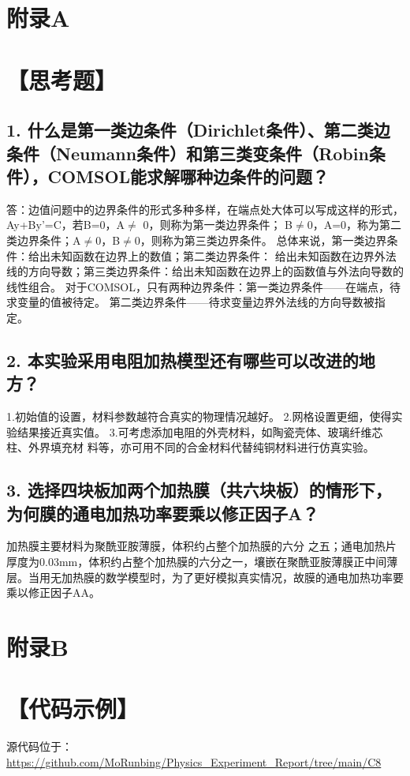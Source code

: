 \documentclass[10pt,a4paper,twoside,UTF8]{ctexart}
\begin{document}
\newpage
\printbibliography[title=参考文献] 
\clearpage

	 
\section*{\LARGE 附录A}
\section*{【思考题】}
\subsection*{1. 什么是第一类边条件（Dirichlet条件）、第二类边条件（Neumann条件）和第三类变条件（Robin条件），COMSOL能求解哪种边条件的问题？}
答：边值问题中的边界条件的形式多种多样，在端点处大体可以写成这样的形式，Ay+By’=C，若B=0，A$\neq$ 0，则称为第一类边界条件；
B$\neq$0，A=0，称为第二类边界条件；A$\neq$0，B$\neq$0，则称为第三类边界条件。
总体来说，第一类边界条件：给出未知函数在边界上的数值；第二类边界条件：
给出未知函数在边界外法线的方向导数；第三类边界条件：给出未知函数在边界上的函数值与外法向导数的线性组合。
对于COMSOL，只有两种边界条件：第一类边界条件——在端点，待求变量的值被待定。
第二类边界条件——待求变量边界外法线的方向导数被指定。
\subsection*{2. 本实验采用电阻加热模型还有哪些可以改进的地方？}
1.初始值的设置，材料参数越符合真实的物理情况越好。
2.网格设置更细，使得实验结果接近真实值。
3.可考虑添加电阻的外壳材料，如陶瓷壳体、玻璃纤维芯柱、外界填充材
料等，亦可用不同的合金材料代替纯铜材料进行仿真实验。
\subsection*{3. 选择四块板加两个加热膜（共六块板）的情形下，为何膜的通电加热功率要乘以修正因子A？}
加热膜主要材料为聚酰亚胺薄膜，体积约占整个加热膜的六分
之五；通电加热片厚度为0.03mm，体积约占整个加热膜的六分之一，壤嵌在聚酰亚胺薄膜正中间薄
层。当用无加热膜的数学模型时，为了更好模拟真实情况，故膜的通电加热功率要乘以修正因子AA。

\newpage
\section*{\LARGE 附录B}
\section*{【代码示例】}
源代码位于：\url{https://github.com/MoRunbing/Physics_Experiment_Report/tree/main/C8}
\end{document}
